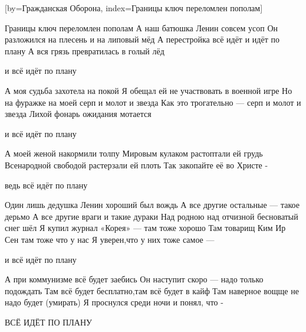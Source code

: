[by={Гражданская Оборона},
                     index={Границы ключ переломлен пополам}]
\beginverse

Границы ключ переломлен пополам
А наш батюшка Ленин совсем усоп
Он разложился на плесень и на липовый мёд
А перестройка всё идёт и идёт по плану
А вся грязь превратилась в голый лёд  
  
\endverse
\beginverse
 
           и всё идёт по плану

\endverse
\beginverse

А моя судьба захотела на покой
Я обещал ей не участвовать в военной игре
Но на фуражке на моей серп и молот и звезда
Как это трогательно — серп и молот и звезда
Лихой фонарь ожидания мотается

\endverse
\beginverse

           и всё идёт по плану

\endverse
\beginverse

А моей женой накормили толпу
Мировым кулаком растоптали ей грудь
Всенародной свободой растерзали ей плоть
Так закопайте её во Христе -

\endverse
\beginverse

           ведь всё идёт по плану

\endverse
\beginverse

Один лишь дедушка Ленин хороший был вождь
А все другие остальные — такое дерьмо
А все другие враги и такие дураки
Над родною над отчизной бесноватый снег шёл
Я купил журнал «Корея» — там тоже хорошо
Там товарищ Ким Ир Сен там тоже что у нас
Я уверен,что у них тоже самое — 

\endverse
\beginverse

           и всё идёт по плану

\endverse
\beginverse

А при коммунизме всё будет заебись
Он наступит скоро — надо только подождать
Там всё будет бесплатно,там всё будет в кайф
Там наверное вощще не надо будет (умирать)
Я проснулся среди ночи и понял, что -

\endverse
\beginverse

           ВСЁ ИДЁТ ПО ПЛАНУ
           
\endverse
\endsong
